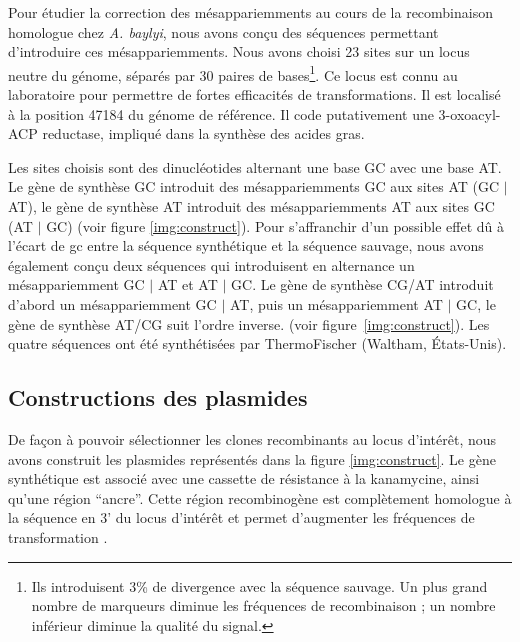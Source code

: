 Pour étudier la correction des mésappariemments au cours de la recombinaison
homologue chez \emph{A. baylyi}, nous avons conçu des séquences permettant
d'introduire ces mésappariemments. Nous avons choisi 23 sites sur un locus
neutre du génome, séparés par 30 paires de bases\footnote{Ils introduisent 3\%
  de divergence avec la séquence sauvage. Un plus grand nombre de marqueurs
  diminue les fréquences de recombinaison ; un nombre inférieur diminue la
  qualité du signal.}. Ce locus est connu au laboratoire pour permettre de
fortes efficacités de transformations. Il est localisé à la position 47184 du
génome de référence. Il code putativement une 3-oxoacyl-ACP reductase, impliqué
dans la synthèse des acides gras\cite{vallenet_microscopeintegrated_2013}.

Les sites choisis sont des dinucléotides alternant une base GC avec une base AT.
Le gène de synthèse GC introduit des mésappariemments GC aux sites AT (GC $|$
AT), le gène de synthèse AT introduit des mésappariemments AT aux sites GC (AT
$|$ GC) (voir figure \ref{img:construct}). Pour s'affranchir d'un possible effet
dû à l'écart de \ac{gc} entre la séquence synthétique et la séquence sauvage,
nous avons également conçu deux séquences qui introduisent en alternance un
mésappariemment GC $|$ AT et AT $|$ GC. Le gène de synthèse CG/AT introduit
d'abord un mésappariemment GC $|$ AT, puis un mésappariemment AT $|$ GC, le gène
de synthèse AT/CG suit l'ordre inverse. (voir figure~\ref{img:construct}). Les
quatre séquences ont été synthétisées par ThermoFischer (Waltham, États-Unis).

\subsection{Constructions des plasmides}
\label{subsec:constructions}

De façon à pouvoir sélectionner les clones recombinants au locus d'intérêt, nous
avons construit les plasmides représentés dans la figure \ref{img:construct}. Le
gène synthétique est associé avec une cassette de résistance à la kanamycine,
ainsi qu'une région ``ancre''. Cette région recombinogène est complètement
homologue à la séquence en 3' du locus d'intérêt et permet d'augmenter les
fréquences de transformation \cite{de_vries_integration_2002,meier_mechanisms_2003}.

